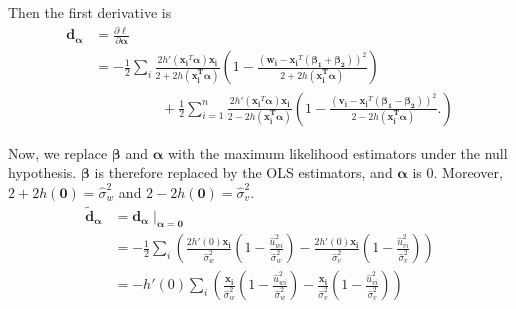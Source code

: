 \documentclass[12pt]{article}
\theoremstyle{theorem}
\begin{document}
Then the first derivative is 
\begin{align*}
\bm{d_{\alpha}} &= \frac{\partial \ell}{\partial \bm{\alpha}}\\
&= -\frac{1}{2} \sum_i  \frac{2h'(\bm{x_i}^T \bm{\alpha})\bm{x_i}}{2+2h(\bm{x_i^T\alpha})} \left(
1 - \frac{(\bm{w_i} - \bm{x_i}^T (\bm{\beta_1 + \beta_2}))^2}{2+2h(\bm{x_i^T\alpha})} 
\right) \\
& \hspace{2cm} 
+ \frac{1}{2} \sum_{i=1}^{n}\frac{2h'(\bm{x_i}^T \bm{\alpha})\bm{x_i}}{2-2h(\bm{x_i^T\alpha})} \left(
1 - \frac{(\bm{v_i} - \bm{x_i}^T (\bm{\beta_1 - \beta_2}))^2}{2-2h(\bm{x_i^T\alpha})} .
\right)
\end{align*}

\noindent Now, we replace $\bm{\beta}$ and $\bm{\alpha}$ with the maximum likelihood estimators under the null hypothesis. $\bm{\beta}$ is therefore replaced by the OLS estimators, and $\bm{\alpha}$ is 0. Moreover,
$2 + 2h(\bm{0}) = \hat{\sigma}_w^2$ and $2-2h(\bm{0}) = \hat{\sigma}_v^2$. 
\begin{align}
\bm{\tilde{d}_{\alpha}} &= \bm{d_{\alpha}}\mid_{\bm{\alpha}=\bm{0}} \\
&= -\frac{1}{2} \sum_i \left(
\frac{2h'(0)\bm{x_i}}{\hat{\sigma}_{w}^2} \left(
1-\frac{\hat{u}_{wi}^2}{\hat{\sigma}_{w}^2}
\right)
-
\frac{2h'(0)\bm{x_i}}{\hat{\sigma}_{v}^2} \left(
1-\frac{\hat{u}_{vi}^2}{\hat{\sigma}_{v}^2}
\right)
\right)\\
&= -h'(0) \sum_i  \left(
\frac{\bm{x_i}}{\hat{\sigma}_{w}^2} \left(
1-\frac{\hat{u}_{wi}^2}{\hat{\sigma}_{w}^2}
\right)
-
\frac{\bm{x_i}}{\hat{\sigma}_{v}^2} \left(
1-\frac{\hat{u}_{vi}^2 }{\hat{\sigma}_{v}^2}
\right)
\right)
\label{first_derivative}
\end{align}
\end{document}
